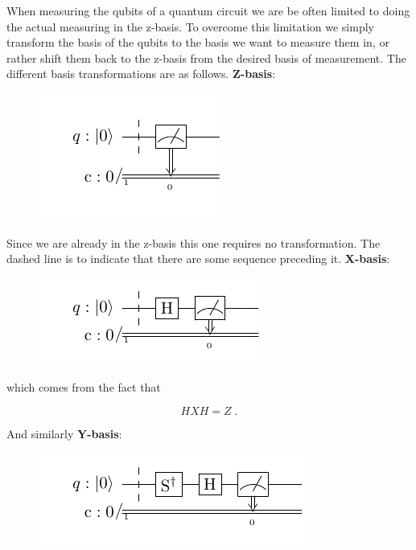 When measuring the qubits of a quantum circuit we are be often limited to doing the actual measuring in the z-basis. To overcome this limitation we simply transform the basis of the qubits to the basis we want to measure them in, or rather shift them back to the z-basis from the desired basis of measurement. The different basis transformations are as follows. \newline
\vskip 0cm
\textbf{Z-basis}:

\begin{figure}[H]
    \centering
    \includegraphics{Figures/Circuits/Theory/zm.pdf}
\end{figure}

Since we are already in the z-basis this one requires no transformation. The dashed line is to indicate that there are some sequence preceding it.
\newline\vskip 0cm
\textbf{X-basis}:

\begin{figure}[H]
    \centering
    \includegraphics{Figures/Circuits/Theory/xm.pdf}
\end{figure}

which comes from the fact that

\begin{equation}
    HXH = Z \; .
\end{equation}

And similarly
\newline\vskip 0cm
\textbf{Y-basis}:

\begin{figure}[H]
    \centering
    \includegraphics{Figures/Circuits/Theory/ym.pdf}
\end{figure}


